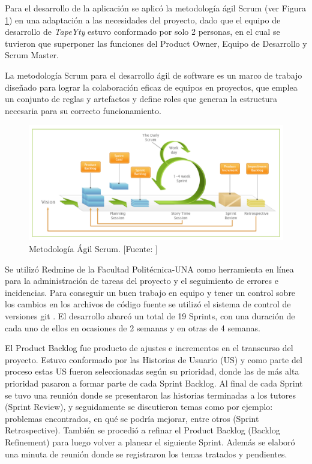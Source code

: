 Para el desarrollo de la aplicación se aplicó la metodología ágil Scrum (ver Figura \ref{fig:scrum}) en una adaptación a las necesidades del proyecto, dado que el equipo de desarrollo de \textit{TapeYty} estuvo conformado por solo 2 personas, en el cual se tuvieron que superponer las funciones del Product Owner, Equipo de Desarrollo y Scrum Master. 


La metodología Scrum para el desarrollo ágil de software es un marco de trabajo diseñado para lograr la colaboración eficaz de equipos en proyectos, que emplea un conjunto de reglas y artefactos y define roles que generan la estructura necesaria para su correcto funcionamiento.

\begin{figure}[H]
    \centering
    \includegraphics[width=\textwidth]{SCRUM.png}
    \caption{Metodología Ágil Scrum. [Fuente: \citep{Gallego2012MetodologiaScrum}]}
    \label{fig:scrum}
\end{figure}

Se utilizó Redmine \citep{RedmineFPUNA} de la Facultad Politécnica-UNA como herramienta en línea para la administración de tareas del proyecto y el seguimiento de errores e incidencias. Para conseguir un buen trabajo en equipo y tener un control sobre los cambios en los archivos de código fuente se utilizó el sistema de control de versiones git \citep{Git}. El desarrollo abarcó un total de 19 Sprints, con una duración de cada uno de ellos en ocasiones de 2 semanas y en otras de 4 semanas. 

El Product Backlog fue producto de ajustes e incrementos en el transcurso del proyecto. Estuvo conformado por las Historias de Usuario (US) y como parte del proceso estas US fueron seleccionadas según su prioridad, donde las de más alta prioridad pasaron a formar parte de cada Sprint Backlog. Al final de cada Sprint se tuvo una reunión donde se presentaron las historias terminadas a los tutores (Sprint Review), y seguidamente se discutieron temas como por ejemplo: problemas encontrados, en qué se podría mejorar, entre otros (Sprint Retrospective). También se procedió a refinar el Product Backlog (Backlog Refinement) para luego volver a planear el siguiente Sprint. Además se elaboró una minuta de reunión donde se registraron los temas tratados y pendientes.

